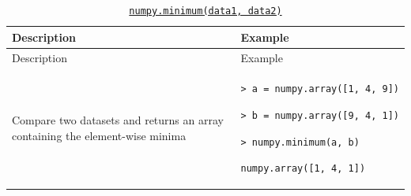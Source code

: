 \documentclass[10pt,a4paperpaper,]{article}
\begin{document}
\begin{longtable}[]{@{}ll@{}}
\caption{\href{http://docs.scipy.org/doc/numpy-1.10.0/reference/generated/numpy.minimum.html}{\texttt{numpy.minimum(data1,\ data2)}}}\tabularnewline
\toprule
\begin{minipage}[b]{0.47\columnwidth}\raggedright\strut
Description\strut
\end{minipage} & \begin{minipage}[b]{0.47\columnwidth}\raggedright\strut
Example\strut
\end{minipage}\tabularnewline
\midrule
\endfirsthead
\toprule
\begin{minipage}[b]{0.47\columnwidth}\raggedright\strut
Description\strut
\end{minipage} & \begin{minipage}[b]{0.47\columnwidth}\raggedright\strut
Example\strut
\end{minipage}\tabularnewline
\midrule
\endhead
\begin{minipage}[t]{0.47\columnwidth}\raggedright\strut
Compare two datasets and returns an array containing the element-wise
minima\strut
\end{minipage} & \begin{minipage}[t]{0.47\columnwidth}\raggedright\strut
\texttt{\textgreater{}\ a\ =\ numpy.array({[}1,\ 4,\ 9{]})}

\texttt{\textgreater{}\ b\ =\ numpy.array({[}9,\ 4,\ 1{]})}

\texttt{\textgreater{}\ numpy.minimum(a,\ b)}

\texttt{numpy.array({[}1,\ 4,\ 1{]})}\strut
\end{minipage}\tabularnewline
\bottomrule
\end{longtable}
\end{document}
